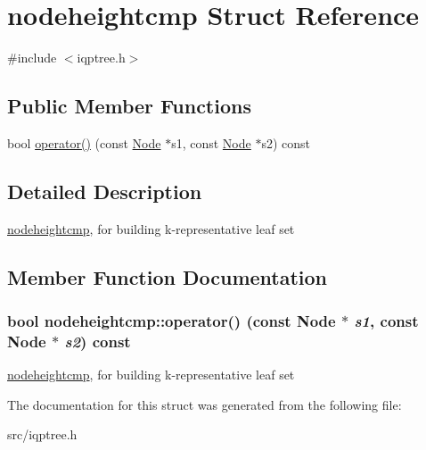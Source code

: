 \hypertarget{structnodeheightcmp}{
\section{nodeheightcmp Struct Reference}
\label{structnodeheightcmp}
}


{\ttfamily \#include $<$iqptree.h$>$}\subsection*{Public Member Functions}
\begin{DoxyCompactItemize}
\item 
bool \hyperlink{structnodeheightcmp_ae30bce4c8c8585e4250e18cdaf51d740}{operator()} (const \hyperlink{classNode}{Node} $\ast$s1, const \hyperlink{classNode}{Node} $\ast$s2) const 
\end{DoxyCompactItemize}


\subsection{Detailed Description}
\hyperlink{structnodeheightcmp}{nodeheightcmp}, for building k-\/representative leaf set 

\subsection{Member Function Documentation}
\hypertarget{structnodeheightcmp_ae30bce4c8c8585e4250e18cdaf51d740}{
\subsubsection[{operator()}]{\setlength{\rightskip}{0pt plus 5cm}bool nodeheightcmp::operator() (const {\bf Node} $\ast$ {\em s1}, \/  const {\bf Node} $\ast$ {\em s2}) const}}
\label{structnodeheightcmp_ae30bce4c8c8585e4250e18cdaf51d740}
\hyperlink{structnodeheightcmp}{nodeheightcmp}, for building k-\/representative leaf set 

The documentation for this struct was generated from the following file:\begin{DoxyCompactItemize}
\item 
src/iqptree.h\end{DoxyCompactItemize}
